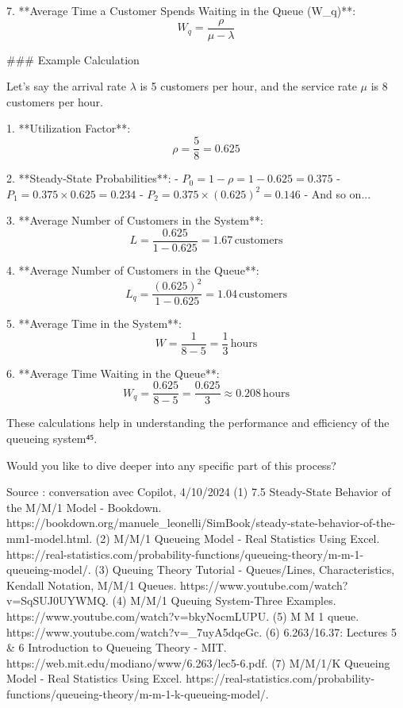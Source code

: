 7. **Average Time a Customer Spends Waiting in the Queue (W_q)**:
   $$W_q = \frac{\rho}{\mu - \lambda}$$

### Example Calculation

Let's say the arrival rate \(\lambda\) is 5 customers per hour, and the service rate \(\mu\) is 8 customers per hour.

1. **Utilization Factor**:
   $$\rho = \frac{5}{8} = 0.625$$

2. **Steady-State Probabilities**:
   - \(P_0 = 1 - \rho = 1 - 0.625 = 0.375\)
   - \(P_1 = 0.375 \times 0.625 = 0.234\)
   - \(P_2 = 0.375 \times (0.625)^2 = 0.146\)
   - And so on...

3. **Average Number of Customers in the System**:
   $$L = \frac{0.625}{1 - 0.625} = 1.67 \, \text{customers}$$

4. **Average Number of Customers in the Queue**:
   $$L_q = \frac{(0.625)^2}{1 - 0.625} = 1.04 \, \text{customers}$$

5. **Average Time in the System**:
   $$W = \frac{1}{8 - 5} = \frac{1}{3} \, \text{hours}$$

6. **Average Time Waiting in the Queue**:
   $$W_q = \frac{0.625}{8 - 5} = \frac{0.625}{3} \approx 0.208 \, \text{hours}$$

These calculations help in understanding the performance and efficiency of the queueing system⁴⁵.

Would you like to dive deeper into any specific part of this process?

Source : conversation avec Copilot, 4/10/2024
(1) 7.5 Steady-State Behavior of the M/M/1 Model - Bookdown. https://bookdown.org/manuele_leonelli/SimBook/steady-state-behavior-of-the-mm1-model.html.
(2) M/M/1 Queueing Model - Real Statistics Using Excel. https://real-statistics.com/probability-functions/queueing-theory/m-m-1-queueing-model/.
(3) Queuing Theory Tutorial - Queues/Lines, Characteristics, Kendall Notation, M/M/1 Queues. https://www.youtube.com/watch?v=SqSUJ0UYWMQ.
(4) M/M/1 Queuing System-Three Examples. https://www.youtube.com/watch?v=bkyNocmLUPU.
(5) M M 1 queue. https://www.youtube.com/watch?v=_7uyA5dqeGc.
(6) 6.263/16.37: Lectures 5 & 6 Introduction to Queueing Theory - MIT. https://web.mit.edu/modiano/www/6.263/lec5-6.pdf.
(7) M/M/1/K Queueing Model - Real Statistics Using Excel. https://real-statistics.com/probability-functions/queueing-theory/m-m-1-k-queueing-model/.
